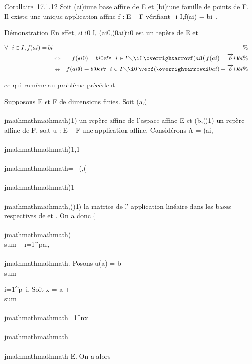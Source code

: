 Corollaire~17.1.12 Soit (ai)i\inI une base affine de E
et (bi)i\inI une famille de points de F. Il existe une
unique application affine f : E \rightarrow~ F vérifiant
\forall~i \in I,f(ai) = bi~.

Démonstration En effet, si i0 \in I,
(ai0,(\overrightarrowai0ai)i\inI\diagdown\i0\)
est un repère de E et

\begin{align*} \forall~~i \in
I,f(ai) = bi&& \%&
\\ & \Leftrightarrow &
f(ai0) =
bi0\text et
\forall~~i \in I
\diagdown\i0\,
\overrightarrowf(ai0)f(ai)
=\overrightarrow
bi0bi\%&
\\ & \Leftrightarrow &
f(ai0) =
bi0\text et
\forall~~i \in I
\diagdown\i0\,
\vecf(\overrightarrowai0ai)
=\overrightarrow bi0bi
\%& \\ \end{align*}

ce qui ramène au problème précédent.

Supposons E et F de dimensions finies. Soit
(a,(\vece\\\\jmathmathmathmath)1\leqi\leqn) un repère
affine de l'espace affine E et
(b,(\vecfi)1\leqi\leqp) un repère
affine de F, soit u : E \rightarrow~ F une application affine. Considérons A =
(ai,\\\\jmathmathmathmath)1\leqi\leqp,1\leq\\\\jmathmathmathmath\leqn =\
\mathrmMat
(\vecu,(\vece\\\\jmathmathmathmath)1\leq\\\\jmathmathmathmath\leqn,(\vecfi)1\leqi\leqp)
la matrice de l' application linéaire \vecu dans les
bases respectives de \overrightarrowE et
\overrightarrowF. On a donc
\vecu(\vece\\\\jmathmathmathmath)
= \\sum ~
i=1^pai,\\\\jmathmathmathmath\vecfi.
Posons u(a) = b +\ \\sum

i=1^p\alpha~i\vecfi.
Soit x = a + \\sum ~
\\\\jmathmathmathmath=1^nx\\\\jmathmathmathmath\vece\\\\jmathmathmathmath \in E.
On a alors

